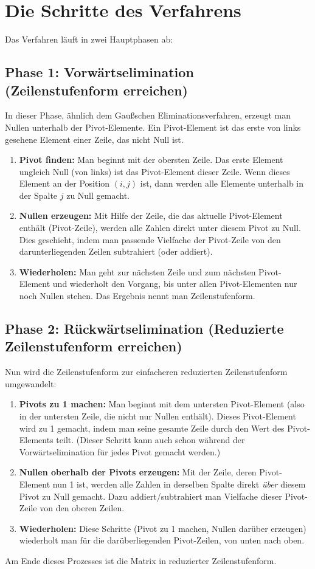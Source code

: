 \section{Die Schritte des Verfahrens}
Das Verfahren läuft in zwei Hauptphasen ab:

\subsection{Phase 1: Vorwärtselimination (Zeilenstufenform erreichen)}
In dieser Phase, ähnlich dem Gaußschen Eliminationsverfahren, erzeugt man Nullen unterhalb der Pivot-Elemente. Ein Pivot-Element ist das erste von links gesehene Element einer Zeile, das nicht Null ist.
\begin{enumerate}
    \item \textbf{Pivot finden:} Man beginnt mit der obersten Zeile. Das erste Element ungleich Null (von links) ist das Pivot-Element dieser Zeile. Wenn dieses Element an der Position $(i,j)$ ist, dann werden alle Elemente unterhalb in der Spalte $j$ zu Null gemacht.
    \item \textbf{Nullen erzeugen:} Mit Hilfe der Zeile, die das aktuelle Pivot-Element enthält (Pivot-Zeile), werden alle Zahlen direkt unter diesem Pivot zu Null. Dies geschieht, indem man passende Vielfache der Pivot-Zeile von den darunterliegenden Zeilen subtrahiert (oder addiert).
    \item \textbf{Wiederholen:} Man geht zur nächsten Zeile und zum nächsten Pivot-Element und wiederholt den Vorgang, bis unter allen Pivot-Elementen nur noch Nullen stehen. Das Ergebnis nennt man Zeilenstufenform.
\end{enumerate}

\subsection{Phase 2: Rückwärtselimination (Reduzierte Zeilenstufenform erreichen)}
Nun wird die Zeilenstufenform zur einfacheren reduzierten Zeilenstufenform umgewandelt:
\begin{enumerate}
    \item \textbf{Pivots zu 1 machen:} Man beginnt mit dem untersten Pivot-Element (also in der untersten Zeile, die nicht nur Nullen enthält). Dieses Pivot-Element wird zu 1 gemacht, indem man seine gesamte Zeile durch den Wert des Pivot-Elements teilt. (Dieser Schritt kann auch schon während der Vorwärtselimination für jedes Pivot gemacht werden.)
    \item \textbf{Nullen oberhalb der Pivots erzeugen:} Mit der Zeile, deren Pivot-Element nun 1 ist, werden alle Zahlen in derselben Spalte direkt \textit{über} diesem Pivot zu Null gemacht. Dazu addiert/subtrahiert man Vielfache dieser Pivot-Zeile von den oberen Zeilen.
    \item \textbf{Wiederholen:} Diese Schritte (Pivot zu 1 machen, Nullen darüber erzeugen) wiederholt man für die darüberliegenden Pivot-Zeilen, von unten nach oben.
\end{enumerate}
Am Ende dieses Prozesses ist die Matrix in reduzierter Zeilenstufenform.

